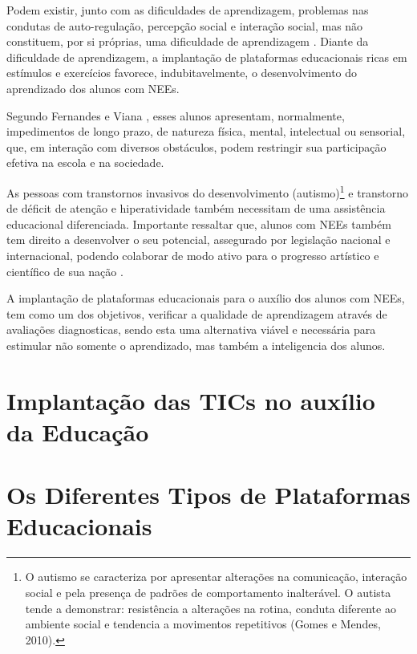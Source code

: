 \newpage

Podem existir, junto com as dificuldades de aprendizagem, problemas nas condutas de auto-regulação, percepção social e interação social, mas não constituem, por si próprias, uma dificuldade de aprendizagem \cite{bergonzoni2006dificuldades}. 
Diante da dificuldade de aprendizagem, a implantação de plataformas educacionais ricas em estímulos e exercícios favorece, indubitavelmente, o desenvolvimento do aprendizado dos alunos com NEEs. 

Segundo Fernandes e Viana \cite{fernandes2009alunos}, esses alunos apresentam, normalmente, impedimentos de longo prazo, de natureza física, mental, intelectual ou sensorial, que, em interação com diversos obstáculos, podem restringir sua participação efetiva na escola e na sociedade. 

As pessoas com transtornos invasivos do desenvolvimento (autismo)\footnote{O autismo se caracteriza por apresentar alterações na comunicação, interação social e pela presença de padrões de comportamento inalterável. O autista tende a demonstrar: resistência a alterações na rotina, conduta diferente ao ambiente social e tendencia a movimentos repetitivos (Gomes e Mendes, 2010).} e transtorno de déficit de atenção e hiperatividade também necessitam de uma assistência educacional diferenciada.
Importante ressaltar que, alunos com NEEs também tem direito a desenvolver o seu potencial, assegurado por legislação nacional e internacional, podendo colaborar de modo ativo para o progresso artístico e científico de sua nação \cite{fernandes2009alunos}.

A implantação de plataformas educacionais para o auxílio dos alunos com NEEs, tem como um dos objetivos, verificar a qualidade de aprendizagem através de avaliações diagnosticas, sendo esta uma alternativa viável e necessária para estimular não somente o aprendizado, mas também a inteligencia dos alunos.

\section{Implantação das TICs no auxílio da Educação} 


\section{Os Diferentes Tipos de Plataformas Educacionais} 